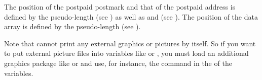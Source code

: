 The position of the postpaid postmark and that of the
postpaid address is defined by the  pseudo-length (see
) as well as
 and  (see
). The position of
the data array is defined by the  pseudo-length 
(see ).

Note that \KOMAScript{} cannot print any external
graphics or pictures by itself. So if you want to put external picture files
into variables like  or , you
must load an additional graphics package like
 or
 and use, for instance, the
 command in the  of the variables.%
%
\EndIndexGroup


